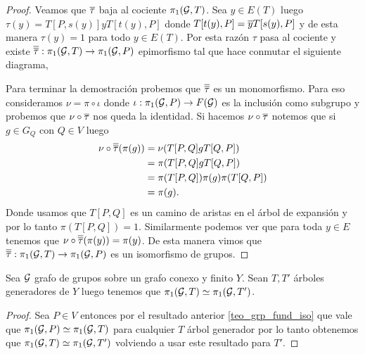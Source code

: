 \documentclass[tesis.tex]{subfiles}
\begin{document}
\begin{proof}
	Veamos que $\overline{\tau}$ baja al cociente $\pi_1({\cal G}, T)$.
	Sea $y \in E(T)$ luego $\tau(y) = T[P,s(y)]yT[t(y), P]$ donde $T[t(y), P] = \overline y T[s(y), P]$ y de esta manera $\tau(y) = 1$ para todo $y \in E(T)$.
	Por esta razón $\tau$ pasa al cociente y existe $\overline{\overline{\tau}}: \pi_{1}({\cal G}, T) \to \pi_1 ({\cal G}, P)$ epimorfismo tal que hace conmutar el siguiente diagrama,
	
	\begin{center}
	\end{center}
	
	Para terminar la demostración probemos que $\overline{\overline{\tau}}$ es un monomorfismo.
	Para eso consideramos $\nu = \pi \circ \iota$ donde $\iota: \pi_1({\cal G},P) \to F({\cal G})$ es la inclusión como subgrupo y probemos que $\nu \circ \overline \tau$ nos queda la identidad.
	Si hacemos $\nu \circ {\overline\tau}$ notemos que si $g \in G_Q$ con $Q \in V$ luego
	\begin{align*}
		\nu \circ \overline{\overline{ \tau}} (\pi (g)) & = \nu (T[P,Q]gT[Q,P]) \\
					&= \pi(T[P,Q]gT[Q,P]) \\
					&= \pi(T[P,Q]) \pi (g) \pi (T[Q,P]) \\
					&= \pi(g).
	\end{align*}
	Donde usamos que $T[P,Q]$ es un camino de aristas en el árbol de expansión y por lo tanto $\pi(T[P,Q]) = 1$. 
	Similarmente podemos ver que para toda $y \in E$ tenemos que $\nu \circ \overline {\overline \tau} (\pi(y)) = \pi(y)$.
	De esta manera vimos que $\overline{\overline \tau} : \pi_{1}({\cal G},T) \to \pi_{1}({\cal G},P)$ es un isomorfismo de grupos.
	
\end{proof}

\begin{coro}
	Sea ${\cal G}$ grafo de grupos sobre un grafo conexo y finito $Y$.
	Sean $T, T'$ árboles generadores de $Y$ luego tenemos que $\pi_1({\cal G},T) \simeq \pi_1({\cal G},T')$.
\end{coro}
\begin{proof}
	Sea $P \in V$ entonces por el resultado anterior \ref{teo_grp_fund_iso} que vale que $\pi_1({\cal G},P) \simeq \pi_1({\cal G},T)$ para cualquier $T$ árbol generador por lo tanto obtenemos que $\pi_1({\cal G}, T) \simeq \pi_1({\cal G},T')$ volviendo a usar este resultado para $T'$.
	
\end{proof}
\end{document}
